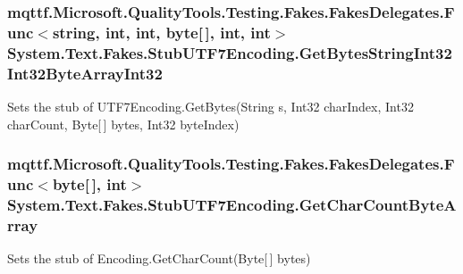 \hypertarget{class_system_1_1_text_1_1_fakes_1_1_stub_u_t_f7_encoding_afedba36c2f783da43a9f6e47d3c38eac}{
\subsubsection[{Get\-Bytes\-String\-Int32\-Int32\-Byte\-Array\-Int32}]{\setlength{\rightskip}{0pt plus 5cm}mqttf.\-Microsoft.\-Quality\-Tools.\-Testing.\-Fakes.\-Fakes\-Delegates.\-Func$<$string, int, int, byte\mbox{[}$\,$\mbox{]}, int, int$>$ System.\-Text.\-Fakes.\-Stub\-U\-T\-F7\-Encoding.\-Get\-Bytes\-String\-Int32\-Int32\-Byte\-Array\-Int32}}\label{class_system_1_1_text_1_1_fakes_1_1_stub_u_t_f7_encoding_afedba36c2f783da43a9f6e47d3c38eac}


Sets the stub of U\-T\-F7\-Encoding.\-Get\-Bytes(\-String s, Int32 char\-Index, Int32 char\-Count, Byte\mbox{[}$\,$\mbox{]} bytes, Int32 byte\-Index)

\hypertarget{class_system_1_1_text_1_1_fakes_1_1_stub_u_t_f7_encoding_accbdc42a135380a55b0f58569c93c24e}{
\subsubsection[{Get\-Char\-Count\-Byte\-Array}]{\setlength{\rightskip}{0pt plus 5cm}mqttf.\-Microsoft.\-Quality\-Tools.\-Testing.\-Fakes.\-Fakes\-Delegates.\-Func$<$byte\mbox{[}$\,$\mbox{]}, int$>$ System.\-Text.\-Fakes.\-Stub\-U\-T\-F7\-Encoding.\-Get\-Char\-Count\-Byte\-Array}}\label{class_system_1_1_text_1_1_fakes_1_1_stub_u_t_f7_encoding_accbdc42a135380a55b0f58569c93c24e}


Sets the stub of Encoding.\-Get\-Char\-Count(\-Byte\mbox{[}$\,$\mbox{]} bytes)

